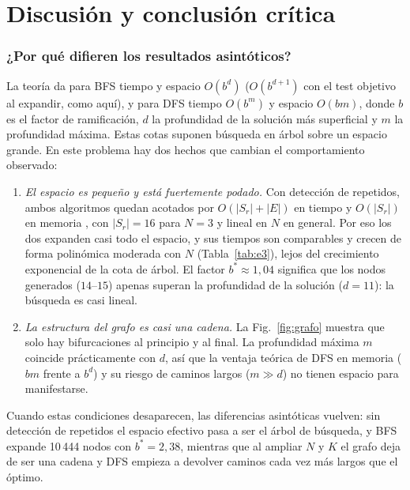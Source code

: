 \documentclass[runningheads]{llncs}
\newcommand{\Sr}{S_{r}}
\begin{document}
\section{Discusión y conclusión crítica}\label{sec:discusion}

\subsubsection{¿Por qué difieren los resultados asintóticos?}
La teoría \cite{russell2020} da para BFS tiempo y espacio $O(b^{d})$
($O(b^{d+1})$ con el test objetivo al expandir, como aquí), y para DFS tiempo
$O(b^{m})$ y espacio $O(bm)$, donde $b$ es el factor de ramificación, $d$ la
profundidad de la solución más superficial y $m$ la profundidad máxima. Estas
cotas suponen búsqueda en árbol sobre un espacio grande. En este problema hay
dos hechos que cambian el comportamiento observado:
\begin{enumerate}
\item \emph{El espacio es pequeño y está fuertemente podado.} Con detección de
repetidos, ambos algoritmos quedan acotados por $O(|\Sr|+|E|)$ en tiempo y
$O(|\Sr|)$ en memoria \cite{cormen2022}, con $|\Sr|=16$ para $N=3$ y lineal en
$N$ en general. Por eso los dos expanden casi todo el espacio, y sus tiempos son comparables y crecen de forma polinómica moderada con $N$
(Tabla~\ref{tab:e3}), lejos del crecimiento exponencial de la cota de árbol. El
factor $b^*\approx 1{,}04$ significa que los nodos generados ($14$--$15$) apenas
superan la profundidad de la solución ($d=11$): la búsqueda es casi lineal.
\item \emph{La estructura del grafo es casi una cadena.} La Fig.~\ref{fig:grafo}
muestra que solo hay bifurcaciones al principio y al final. La profundidad máxima
$m$ coincide prácticamente con $d$, así que la ventaja teórica de DFS en memoria
($bm$ frente a $b^d$) y su riesgo de caminos largos ($m\gg d$) no tienen espacio
para manifestarse.
\end{enumerate}
Cuando estas condiciones desaparecen, las diferencias asintóticas vuelven: sin
detección de repetidos el espacio efectivo pasa a ser el árbol de búsqueda, y BFS
expande 10\,444 nodos con $b^*=2{,}38$, mientras que al ampliar $N$ y $K$ el
grafo deja de ser una cadena y DFS empieza a devolver caminos cada vez más largos que el óptimo.
\end{document}
